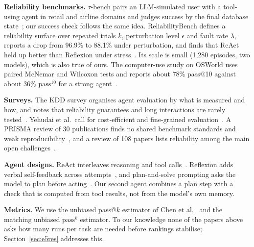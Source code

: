 \documentclass[10pt,a4paper,twocolumn]{article}
\newcommand{\passk}[1]{\mathrm{pass}^{#1}}
\begin{document}
\textbf{Reliability benchmarks.} $\tau$-bench pairs an LLM-simulated user with a tool-using agent in retail and airline
domains and judges success by the final database state~\cite{taubench}; our success check follows the same idea.
ReliabilityBench defines a reliability surface over repeated trials $k$, perturbation level $\epsilon$ and fault rate
$\lambda$, reports a drop from 96.9\% to 88.1\% under perturbation, and finds that ReAct held up better than Reflexion
under stress~\cite{reliabilitybench}. Its scale is small (1,280 episodes, two models), which is also true of ours. The
computer-use study on OSWorld uses paired McNemar and Wilcoxon tests and reports about 78\% pass@10 against about 36\%
$\passk{10}$ for a strong agent~\cite{cua}.

\textbf{Surveys.} The KDD survey organises agent evaluation by what is measured and how, and notes that reliability
guarantees and long interactions are rarely tested~\cite{kdd}. Yehudai et al.\ call for cost-efficient and fine-grained
evaluation~\cite{yehudai}. A PRISMA review of 30 publications finds no shared benchmark standards and weak
reproducibility~\cite{gabauer}, and a review of 108 papers lists reliability among the main open
challenges~\cite{chowa}.

\textbf{Agent designs.} ReAct interleaves reasoning and tool calls~\cite{react}. Reflexion adds verbal self-feedback
across attempts~\cite{reflexion}, and plan-and-solve prompting asks the model to plan before acting~\cite{planandsolve}.
Our second agent combines a plan step with a check that is computed from tool results, not from the model's own memory.

\textbf{Metrics.} We use the unbiased pass@$k$ estimator of Chen et al.~\cite{codex} and the matching unbiased
$\passk{k}$ estimator. To our knowledge none of the papers above asks how many runs per task are needed before rankings
stabilise; Section~\ref{sec:e5res} addresses this.
\end{document}
